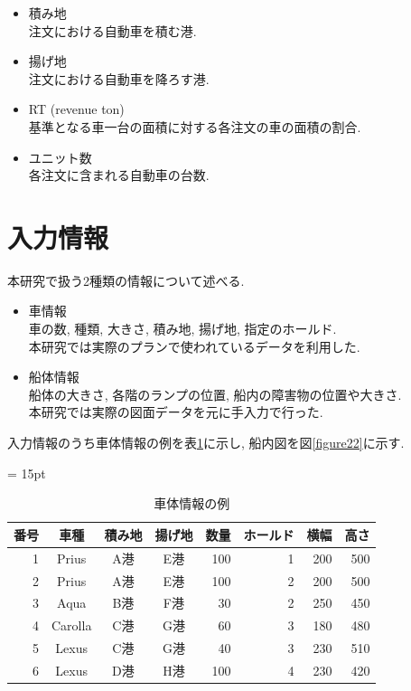 \begin{itemize}
    \item 積み地 \\
    注文における自動車を積む港.

    \item 揚げ地 \\
    注文における自動車を降ろす港.

    \item  RT (revenue ton) \\
    基準となる車一台の面積に対する各注文の車の面積の割合. 

    \item ユニット数 \\
    各注文に含まれる自動車の台数.
\end{itemize}


\section{入力情報}
本研究で扱う2種類の情報について述べる. 

\begin{itemize}
    \item 車情報 \\
    車の数, 種類, 大きさ, 積み地, 揚げ地, 指定のホールド. \\
    本研究では実際のプランで使われているデータを利用した. 
    \item 船体情報 \\
    船体の大きさ, 各階のランプの位置, 船内の障害物の位置や大きさ. \\
    本研究では実際の図面データを元に手入力で行った. 

\end{itemize}
入力情報のうち車体情報の例を表\ref{table21}に示し, 船内図を図\ref{figure22}に示す. 

\begin{table}[htbp]
    \tabcolsep = 15pt
    \renewcommand{\arraystretch}{0.8}
    \caption{車体情報の例}
    \label{table21}
    \begin{center}
    \begin{tabular}{rcccrrrr} \hline
    番号 & 車種 & 積み地 & 揚げ地 & 数量 & ホールド & 横幅 & 高さ \\ \hline
    1 & Prius & A港 & E港 & 100 & 1 & 200 & 500 \\
    2 & Prius & A港 & E港 & 100 & 2 & 200 & 500 \\
    3 & Aqua & B港 & F港 & 30 & 2 & 250 & 450 \\
    4 & Carolla & C港 & G港 & 60 & 3 & 180 & 480 \\
    5 & Lexus & C港 & G港 & 40 & 3 & 230 & 510 \\
    6 & Lexus & D港 & H港 & 100 & 4 & 230 & 420 \\
    \hline
    \end{tabular}
    \end{center}
    \end{table}

